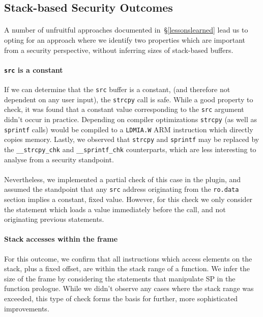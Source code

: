 \documentclass[letterpaper,11pt]{article}
\begin{document}
\subsection{Stack-based Security Outcomes}
\label{stackoutcomes}

\paragraph{}
A number of unfruitful approaches documented in~\S\ref{lessonslearned} lead us
to opting for an approach where we identify two properties which are important
from a security perspective, without inferring sizes of stack-based buffers.

\paragraph{\texttt{src} is a constant}
If we can determine that the \texttt{src} buffer is a constant, (and therefore
not dependent on any user input), the \texttt{strcpy} call is safe. While a
good property to check, it was found that a constant value corresponding to the
\texttt{src} argument didn't occur in practice. Depending on compiler
optimizations \texttt{strcpy} (as well as \texttt{sprintf} calls) would be
compiled to a \texttt{LDMIA.W} ARM instruction which directly copies memory.
Lastly, we observed that \texttt{strcpy} and \texttt{sprintf} may be replaced
by the \texttt{\_\_strcpy\_chk} and \texttt{\_\_sprintf\_chk} counterparts,
which are less interesting to analyse from a security standpoint.

\paragraph{}
Nevertheless, we implemented a partial check of this case in the plugin, and
assumed the standpoint that any \texttt{src} address originating from the
\texttt{ro.data} section implies a constant, fixed value. However, for this
check we only consider the statement which loads a value immediately before the
call, and not originating previous statements. %

\paragraph{Stack accesses within the frame} 
For this outcome, we confirm that all instructions which access elements on
the stack, plus a fixed offset, are within the stack range of a function. We
infer the size of the frame by considering the statements that manipulate
SP in the function prologue. While we didn't observe any cases where the
stack range was exceeded, this type of check forms the basis for further,
more sophisticated improvements.
\end{document}
